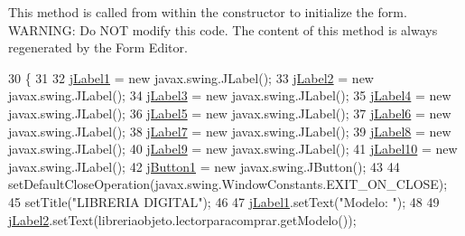 This method is called from within the constructor to initialize the form. W\+A\+R\+N\+I\+NG\+: Do N\+OT modify this code. The content of this method is always regenerated by the Form Editor. 
\begin{DoxyCode}
30                                   \{
31 
32         \mbox{\hyperlink{class_interfaz_package_1_1_consulta_lector_a902ef6727581a080bfe5c84883c7f39e}{jLabel1}} = \textcolor{keyword}{new} javax.swing.JLabel();
33         \mbox{\hyperlink{class_interfaz_package_1_1_consulta_lector_abd8a9863dc8780ef20182d8e6de1f544}{jLabel2}} = \textcolor{keyword}{new} javax.swing.JLabel();
34         \mbox{\hyperlink{class_interfaz_package_1_1_consulta_lector_a105b198c795b5ad60698132d959db7c1}{jLabel3}} = \textcolor{keyword}{new} javax.swing.JLabel();
35         \mbox{\hyperlink{class_interfaz_package_1_1_consulta_lector_a17804aaae39ab2791472fa0422b576ff}{jLabel4}} = \textcolor{keyword}{new} javax.swing.JLabel();
36         \mbox{\hyperlink{class_interfaz_package_1_1_consulta_lector_aae29076b214d7968c66c12c3cb9dcab2}{jLabel5}} = \textcolor{keyword}{new} javax.swing.JLabel();
37         \mbox{\hyperlink{class_interfaz_package_1_1_consulta_lector_a1ae0bbc522d743dbe6a5df3d341f7b3b}{jLabel6}} = \textcolor{keyword}{new} javax.swing.JLabel();
38         \mbox{\hyperlink{class_interfaz_package_1_1_consulta_lector_a0811e604bafe32c5d692a79c0f604233}{jLabel7}} = \textcolor{keyword}{new} javax.swing.JLabel();
39         \mbox{\hyperlink{class_interfaz_package_1_1_consulta_lector_a588cac9adcc7b646bf632082a010dde4}{jLabel8}} = \textcolor{keyword}{new} javax.swing.JLabel();
40         \mbox{\hyperlink{class_interfaz_package_1_1_consulta_lector_a96866944f1cce16d0348b78422bbb375}{jLabel9}} = \textcolor{keyword}{new} javax.swing.JLabel();
41         \mbox{\hyperlink{class_interfaz_package_1_1_consulta_lector_a4325d1c8a4fb7c899a653eaf0380ccad}{jLabel10}} = \textcolor{keyword}{new} javax.swing.JLabel();
42         \mbox{\hyperlink{class_interfaz_package_1_1_consulta_lector_a89e1d76ca4c265da8a91df4b4a2a030d}{jButton1}} = \textcolor{keyword}{new} javax.swing.JButton();
43 
44         setDefaultCloseOperation(javax.swing.WindowConstants.EXIT\_ON\_CLOSE);
45         setTitle(\textcolor{stringliteral}{"LIBRERIA DIGITAL"});
46 
47         \mbox{\hyperlink{class_interfaz_package_1_1_consulta_lector_a902ef6727581a080bfe5c84883c7f39e}{jLabel1}}.setText(\textcolor{stringliteral}{"Modelo: "});
48 
49         \mbox{\hyperlink{class_interfaz_package_1_1_consulta_lector_abd8a9863dc8780ef20182d8e6de1f544}{jLabel2}}.setText(libreriaobjeto.lectorparacomprar.getModelo());

\end{DoxyCode}
